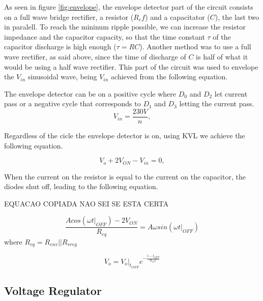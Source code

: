 As seen in figure \ref{fig:envelope}, the envelope detector part of the circuit consists on a full wave bridge rectifier, a resistor ($R_ef$) and a capacitator ($C$), the last two in paralell. To reach the mininum ripple possible, we can increase the resistor impedance and the capacitor capacity, so that the time constant $\tau$ of the capacitor discharge is high enough ($\tau=RC$). Another method was to use a full wave rectifier, as said above, since the time of discharge of $C$ is half of what it would be using a half wave rectifier. This part of the circuit was used to envelope the $V_{in}$ sinusoidal wave, being $V_{in}$ achieved from the following equation.

The envelope detector can be on a positive cycle where $D_0$ and $D_2$ let current pass or a negative cycle that corresponds to $D_1$ and $D_3$ letting the current pass.
\begin{equation}
  V_{in} = \frac{230V}{n},
  \label{eq:vin}
\end{equation}
 
Regardless of the cicle the envelope detector is on, using KVL we achieve the following equation.

\begin{equation}
    V_o + 2V_{ON} - V_{in} = 0,
 \label{eq:envelope2}  
\end{equation}

When the current on the resistor is equal to the current on the capacitor, the diodes shut off, leading to the following equation.

EQUACAO COPIADA NAO SEI SE ESTA CERTA

\begin{equation}
    \frac{Acos(\omega t|_{OFF})-2V_{ON}}{R_{eq}}=A\omega sin(\omega t|_{OFF})
\end{equation}
where $R_{eq}=R_{env}||R_{vreg}$

\begin{equation}
    V_o=V_o|_{t_{OFF}}e^{-\frac{t-t_{OFF}}{R_{eq}C}}
\end{equation}


\subsection{Voltage Regulator}
\label{sec:regulator}

